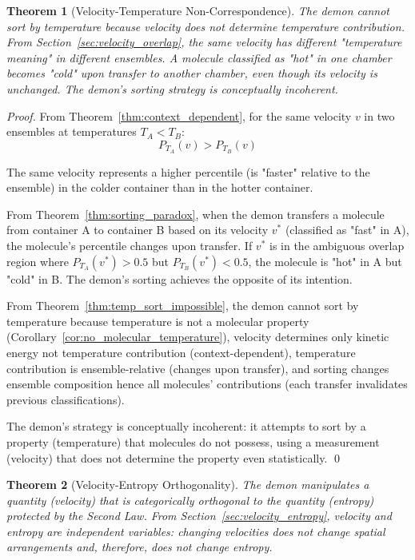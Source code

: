\documentclass[12pt,a4paper]{article}
\newtheorem{theorem}{Theorem}[section]
\theoremstyle{definition}
\theoremstyle{remark}
\begin{document}
\begin{theorem}[Velocity-Temperature Non-Correspondence]
\label{thm:velocity_temperature_non_correspondence}
The demon cannot sort by temperature because velocity does not determine temperature contribution. From Section~\ref{sec:velocity_overlap}, the same velocity has different "temperature meaning" in different ensembles. A molecule classified as "hot" in one chamber becomes "cold" upon transfer to another chamber, even though its velocity is unchanged. The demon's sorting strategy is conceptually incoherent.
\end{theorem}

\begin{proof}
From Theorem~\ref{thm:context_dependent}, for the same velocity $v$ in two ensembles at temperatures $T_A < T_B$:
\begin{equation}
P_{T_A}(v) > P_{T_B}(v)
\end{equation}

The same velocity represents a higher percentile (is "faster" relative to the ensemble) in the colder container than in the hotter container.

From Theorem~\ref{thm:sorting_paradox}, when the demon transfers a molecule from container A to container B based on its velocity $v^*$ (classified as "fast" in A), the molecule's percentile changes upon transfer. If $v^*$ is in the ambiguous overlap region where $P_{T_A}(v^*) > 0.5$ but $P_{T_B}(v^*) < 0.5$, the molecule is "hot" in A but "cold" in B. The demon's sorting achieves the opposite of its intention.

From Theorem~\ref{thm:temp_sort_impossible}, the demon cannot sort by temperature because temperature is not a molecular property (Corollary~\ref{cor:no_molecular_temperature}), velocity determines only kinetic energy not temperature contribution (context-dependent), temperature contribution is ensemble-relative (changes upon transfer), and sorting changes ensemble composition hence all molecules' contributions (each transfer invalidates previous classifications).

The demon's strategy is conceptually incoherent: it attempts to sort by a property (temperature) that molecules do not possess, using a measurement (velocity) that does not determine the property even statistically. \qed
\end{proof}

\begin{theorem}[Velocity-Entropy Orthogonality]
\label{thm:velocity_entropy_orthogonality}
The demon manipulates a quantity (velocity) that is categorically orthogonal to the quantity (entropy) protected by the Second Law. From Section~\ref{sec:velocity_entropy}, velocity and entropy are independent variables: changing velocities does not change spatial arrangements and, therefore, does not change entropy.
\end{theorem}
\end{document}
